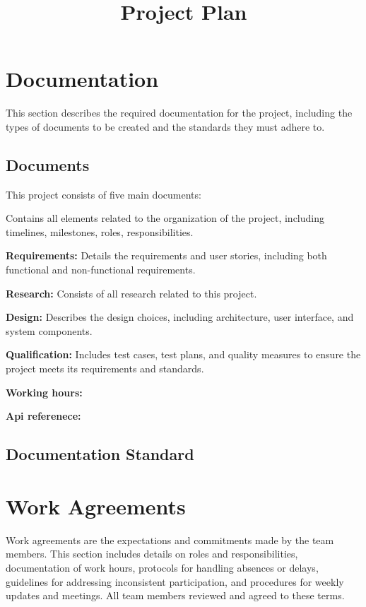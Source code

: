 \documentclass{projdoc}
\title{Project Plan}
\begin{document}
\tablestables
\newpage

\section{Documentation}

This section describes the required documentation for the project, including the
 types of documents to be created and the standards they must adhere to.

\subsection{Documents}

This project consists of five main documents:

\begin{description}
	\item[Project Plan] Contains all elements related to the organization of the
	 project, including timelines, milestones, roles, responsibilities.
	\item \textbf{Requirements:} Details the requirements and 
	user stories, including both functional and non-functional requirements. 
	\item \textbf{Research:} Consists of all research related to this project.
	\item \textbf{Design:} Describes the design choices, including architecture,
	 user interface, and system components.
	\item \textbf{Qualification:} Includes test cases, test plans, and quality 
	measures to ensure the project meets its requirements and standards.
	\item \textbf{Working hours:} 
	\item \textbf{Api referenece:} 
\end{description}

\subsection{Documentation Standard}

\newpage

\section{Work Agreements}
Work agreements are the expectations and commitments made by the team members. 
This section includes details on roles and responsibilities, documentation of 
work hours, protocols for handling absences or delays, guidelines for addressing
 inconsistent participation, and procedures for weekly updates and meetings. All
  team members reviewed and agreed to these terms.
\end{document}
